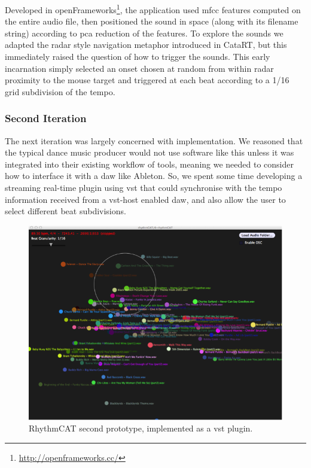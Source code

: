 Developed in openFrameworks\footnote{\url{http://openframeworks.cc/}}, the application used \acrshort{mfcc} features computed on the entire audio file, then positioned the sound in space (along with its filename string) according to \acrshort{pca} reduction of the features. To explore the sounds we adapted the radar style navigation metaphor introduced in CataRT, but this immediately raised the question of how to trigger the sounds. This early incarnation simply selected an onset chosen at random from within radar proximity to the mouse target and triggered at each beat according to a 1/16 grid subdivision of the tempo.

\subsubsection{Second Iteration}

The next iteration was largely concerned with implementation. We reasoned that the typical dance music producer would not use software like this unless it was integrated into their existing workflow of tools, meaning we needed to consider how to interface it with a \acrshort{daw} like Ableton. So, we spent some time developing a streaming real-time plugin using \acrfull{vst} that could synchronise with the tempo information received from a \acrshort{vst}-host enabled \acrshort{daw}, and also allow the user to select different beat subdivisions.

\begin{figure}
	\begin{center}
		\includegraphics[width=1.0\textwidth]{ch06_rhythmcat/figures/rhythmcat_proto2.png}
	\end{center}
	\caption[RhythmCAT second prototype]{RhythmCAT second prototype, implemented as a \acrshort{vst} plugin.}
	\label{fig:rhythmcat_proto2}
\end{figure}

